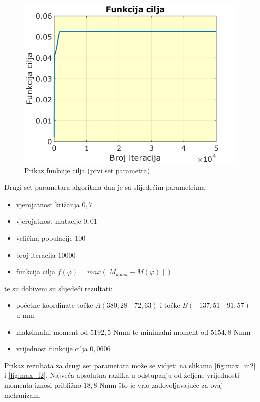 \begin{figure}[h!]
\center
\includegraphics[scale=.6]{slike/max_f1.png}
\caption{Prikaz funkcije cilja (prvi set parametra)}
\label{fig:max_f1}
\end{figure}




\quad Drugi set parametara algoritma dan je sa slijedećim parametrima: 
\begin{itemize}
\item vjerojatnost križanja $0,7$
\item vjerojatnost mutacije $0,01$
\item veličina populacije $100$
\item broj iteracija $10000$
\item funkcija cilja $f(\varphi)=max\left( \mid M_{konst}-M(\varphi)\mid\right) $
\end{itemize}
te su dobiveni su slijedeći rezultati:
\begin{itemize}
\item početne koordinate točke $A(380,28\quad 72,63)$ i točke $B(-137,51\quad  91,57)$ u mm
\item maksimalni moment od $5192,5$  Nmm te minimalni moment od $5154,8$  Nmm
\item vrijednost funkcije cilja $0,0606$
\end{itemize}


Prikaz rezultata za drugi set parametara može se vidjeti na slikama \ref{fig:max_m2} i \ref{fig:max_f2}. Najveća apsolutna razlika u odstupanju od željene vrijednosti momenta iznosi približno $18,8$ Nmm što je vrlo zadovoljavajuće za ovaj mehanizam.

